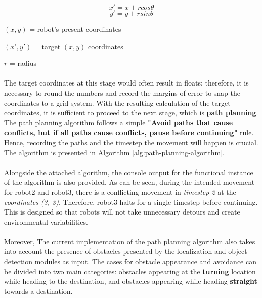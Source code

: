 \[x' = x + rcos\theta\]
\[y' = y + rsin\theta\]

\begin{description}
    \item 
    \item[where:]
    \item \((x, y)\) = robot's present coordinates
    \item \((x', y')\) = target \((x, y)\) coordinates
    \item \(r\) = radius
\end{description}

\paragraph*{}
The target coordinates at this stage would often result in floats; therefore, it is necessary to round the numbers and record the margins of error to snap the coordinates to a grid system. With the resulting calculation of the target coordinates, it is sufficient to proceed to the next stage, which is \textbf{path planning}. The path planning algorithm follows a simple \textbf{"Avoid paths that cause conflicts, but if all paths cause conflicts, pause before continuing"} rule. Hence, recording the paths and the timestep the movement will happen is crucial. The algorithm is presented in Algorithm \ref{alg:path-planning-algorithm}.

\paragraph*{}
Alongside the attached algorithm, the console output for the functional instance of the algorithm is also provided. As can be seen, during the intended movement for robot2 and robot3, there is a conflicting movement in \textit{timestep 2} at the \textit{coordinates (3, 3)}. Therefore, robot3 halts for a single timestep before continuing. This is designed so that robots will not take unnecessary detours and create environmental variabilities.

\paragraph*{}
Moreover, The current implementation of the path planning algorithm also takes into account the presence of obstacles presented by the localization and object detection modules as input. The cases for obstacle appearance and avoidance can be divided into two main categories: obstacles appearing at the \textbf{turning} location while heading to the destination, and obstacles appearing while heading \textbf{straight} towards a destination.

